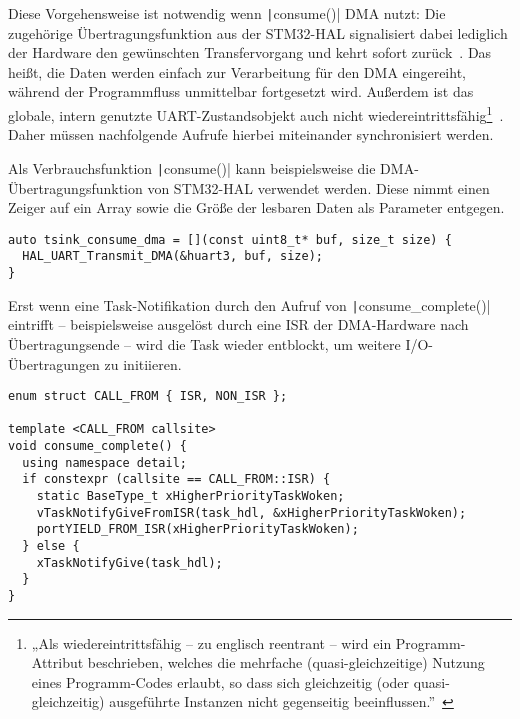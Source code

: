 Diese Vorgehensweise ist notwendig wenn \texttt|consume()| DMA nutzt:
Die zugehörige Übertragungsfunktion aus der STM32-HAL signalisiert dabei
lediglich der Hardware den gewünschten Transfervorgang und kehrt sofort
zurück~\cite{HAL_UART_Transmit_DMA}. Das heißt, die Daten werden einfach zur
Verarbeitung für den DMA eingereiht, während der Programmfluss unmittelbar
fortgesetzt wird. Außerdem ist das globale, intern genutzte UART-Zustandsobjekt
auch nicht wiedereintrittsfähig\footnote{„Als wiedereintrittsfähig -- zu
englisch reentrant -- wird ein Programm-Attribut beschrieben, welches die
mehrfache (quasi-gleichzeitige) Nutzung eines Programm-Codes erlaubt, so dass
sich gleichzeitig (oder quasi-gleichzeitig) ausgeführte Instanzen nicht
gegenseitig
beeinflussen.”~\cite{wiedereintrittsfaehigkeit}}~\cite{stm32_hal_reentrancy}.
Daher müssen nachfolgende Aufrufe hierbei miteinander synchronisiert werden.

Als Verbrauchsfunktion \texttt|consume()| kann beispielsweise die
DMA-Übertragungsfunktion von STM32-HAL verwendet werden. Diese nimmt einen
Zeiger auf ein Array sowie die Größe der lesbaren Daten als Parameter entgegen.

\begin{code}
\begin{verbatim}
auto tsink_consume_dma = [](const uint8_t* buf, size_t size) {
  HAL_UART_Transmit_DMA(&huart3, buf, size);
}
\end{verbatim}
\end{code}

Erst wenn eine Task-Notifikation durch den Aufruf von
\texttt|consume_complete()| eintrifft -- beispielsweise ausgelöst durch
eine \ac{ISR} der DMA-Hardware nach Übertragungsende -- wird die Task wieder
entblockt, um weitere I/O-Übertragungen zu initiieren.

\begin{code}
\begin{verbatim}
enum struct CALL_FROM { ISR, NON_ISR };

template <CALL_FROM callsite>
void consume_complete() {
  using namespace detail;
  if constexpr (callsite == CALL_FROM::ISR) {
    static BaseType_t xHigherPriorityTaskWoken;
    vTaskNotifyGiveFromISR(task_hdl, &xHigherPriorityTaskWoken);
    portYIELD_FROM_ISR(xHigherPriorityTaskWoken);
  } else {
    xTaskNotifyGive(task_hdl);
  }
}
\end{verbatim}
\end{code}

